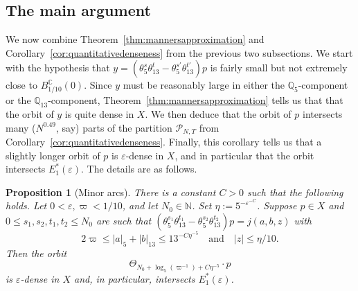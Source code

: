 \documentclass[11pt]{amsart}
\newtheorem{proposition}[lemma]{Proposition}
\theoremstyle{definition}
\newcommand{\C}{{\mathbb C}}
\newcommand{\N}{{\mathbb N}}
\newcommand{\Q}{{\mathbb Q}}
\begin{document}
\subsection{The main argument}
We now combine Theorem~\ref{thm:mannersapproximation} and Corollary~\ref{cor:quantitativedenseness} from the previous two subsections.  We start with the hypothesis that $y=(\theta_5^s\theta_{13}^t-\theta_5^{s'}\theta_{13}^{t'})p$ is fairly small but not extremely close to $B^{\C}_{1/10}(0)$.  Since $y$ must be reasonably large in either the $\Q_5$-component or the $\Q_{13}$-component, Theorem~\ref{thm:mannersapproximation} tells us that that the orbit of $y$ is quite dense in $X$.  We then deduce that the orbit of $p$ intersects many ($N^{0.49}$, say) parts of the partition $\mathcal{P}_{N,T}$ from Corollary~\ref{cor:quantitativedenseness}.   Finally, this corollary tells us that a slightly longer orbit of $p$ is $\varepsilon$-dense in $X$, and in particular that the orbit intersects $E_1^*(\varepsilon)$.  The details are as follows.

\begin{proposition}[Minor arcs]\label{prop:minor}
There is a constant $C>0$ such that the following holds.  Let $0<\varepsilon, \varpi<1/10$, and let $N_0 \in \N$.  Set $\eta:=5^{-\varepsilon^{-C}}$.  Suppose $p \in X$ and $0 \leq s_1,s_2,t_1,t_2 \leq N_0$ are such that $(\theta_5^{s_1}\theta_{13}^{t_1}-\theta_5^{s_2}\theta_{13}^{t_2})p=j(a,b,z)$ with
$$2\varpi \leq |a|_5+|b|_{13} \leq 13^{-C \eta^{-5}} \quad \text{and} \quad |z| \leq \eta/10.$$
Then the orbit
$$\Theta_{N_0+\log_5(\varpi^{-1})+C\eta^{-5}} \cdot p$$
is $\varepsilon$-dense in $X$ and, in particular, intersects $E_1^*(\varepsilon)$.
\end{proposition}
\end{document}
